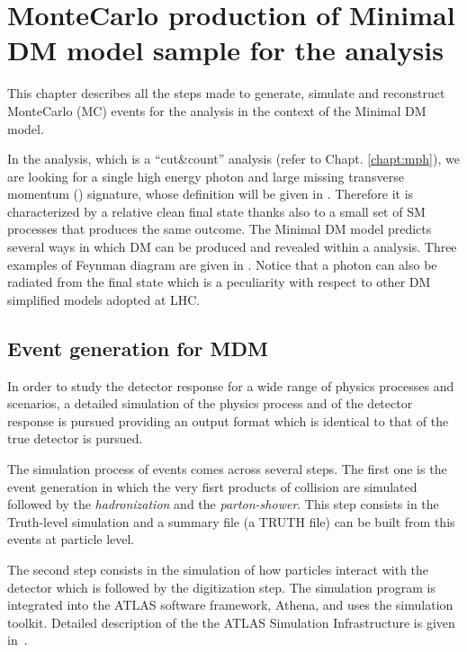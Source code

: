 \chapter[MonteCarlo sample production]{MonteCarlo production of Minimal DM model sample for the \mph analysis}

\lettrine{T}{}his chapter describes all the steps made to generate, simulate and reconstruct MonteCarlo (MC) events for the \mph analysis in the context of the Minimal DM model.

In the \mph analysis, which is a ``cut\&count'' analysis (refer to Chapt. \ref{chapt:mph}), we are looking for a single high energy photon and large missing transverse momentum (\met) signature, whose definition will be given in \Sect{\ref{sec:recoreal}}. Therefore it is characterized by a relative clean final state thanks also to a small set of SM processes that produces the same outcome. The Minimal DM model predicts several ways in which DM can be produced and revealed within a \mph analysis. Three examples of Feynman diagram are given in \Fig{\ref{fig:feynman}}. Notice that a photon can also be radiated from the final state which is a peculiarity with respect to other DM simplified models adopted at LHC.



\section{Event generation for MDM}
In order to study the detector response for a wide range of physics processes and scenarios, a detailed simulation  of the physics process and of the detector response is pursued providing an output format which is identical to that of the true detector is pursued. 

The simulation process of events comes across several steps. The first one is the event generation in which the very fisrt products of \pp collision are simulated followed by the \emph{hadronization} and the \emph{parton-shower}. This step consists in the Truth-level simulation and a summary file (a TRUTH file) can be built from this events at particle level.

The second step consists in the simulation of how particles interact with the detector which is followed by the digitization step. The simulation program is integrated into the ATLAS software framework, Athena, and uses the \geant \cite{geant4} simulation toolkit. Detailed description of the the ATLAS Simulation Infrastructure is given in~\cite{simulation}.

